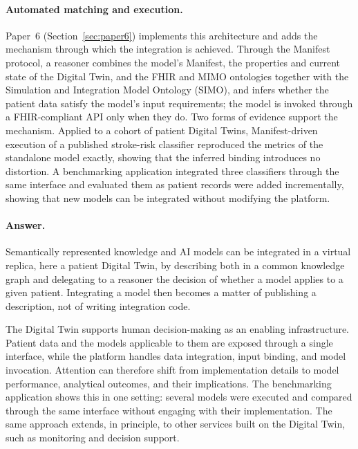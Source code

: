 \paragraph{Automated matching and execution.}
Paper~6 (Section~\ref{sec:paper6}) implements this architecture and adds the mechanism through which the integration is achieved. Through the Manifest protocol, a reasoner combines the model's Manifest, the properties and current state of the Digital Twin, and the FHIR and MIMO ontologies together with the Simulation and Integration Model Ontology (SIMO), and infers whether the patient data satisfy the model's input requirements; the model is invoked through a FHIR-compliant API only when they do. Two forms of evidence support the mechanism. Applied to a cohort of patient Digital Twins, Manifest-driven execution of a published stroke-risk classifier reproduced the metrics of the standalone model exactly, showing that the inferred binding introduces no distortion. A benchmarking application integrated three classifiers through the same interface and evaluated them as patient records were added incrementally, showing that new models can be integrated without modifying the platform. %

\paragraph{Answer.}
Semantically represented knowledge and AI models can be integrated in a virtual replica, here a patient Digital Twin, by describing both in a common knowledge graph and delegating to a reasoner the decision of whether a model applies to a given patient. Integrating a model then becomes a matter of publishing a description, not of writing integration code.

The Digital Twin supports human decision-making as an enabling infrastructure. Patient data and the models applicable to them are exposed through a single interface, while the platform handles data integration, input binding, and model invocation. Attention can therefore shift from implementation details to model performance, analytical outcomes, and their implications. The benchmarking application shows this in one setting: several models were executed and compared through the same interface without engaging with their implementation. The same approach extends, in principle, to other services built on the Digital Twin, such as monitoring and decision support.

